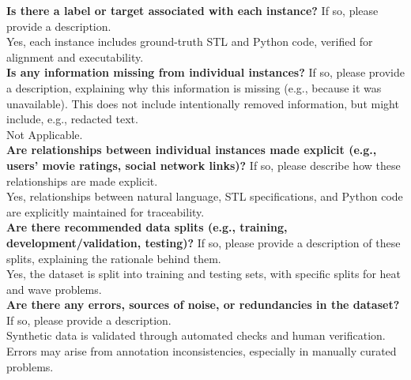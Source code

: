     \textcolor{\sectioncolor}{\textbf{Is there a label or target associated with each instance?
    }
    If so, please provide a description.
    } \\
    Yes, each instance includes ground-truth STL and Python code, verified for alignment and executability. \\
    
    \textcolor{\sectioncolor}{\textbf{Is any information missing from individual instances?
    }
    If so, please provide a description, explaining why this information is
    missing (e.g., because it was unavailable). This does not include
    intentionally removed information, but might include, e.g., redacted text.
    } \\
    Not Applicable. \\
    
    \textcolor{\sectioncolor}{\textbf{Are relationships between individual instances made explicit (e.g., users’
    movie ratings, social network links)?
    }
    If so, please describe how these relationships are made explicit.
    } \\
    Yes, relationships between natural language, STL specifications, and Python code are explicitly maintained for traceability. \\
    
    \textcolor{\sectioncolor}{\textbf{Are there recommended data splits (e.g., training, development/validation,
    testing)?
    }
    If so, please provide a description of these splits, explaining the
    rationale behind them.
    } \\
    Yes, the dataset is split into training and testing sets, with specific splits for heat and wave problems. \\
    
    \textcolor{\sectioncolor}{\textbf{Are there any errors, sources of noise, or redundancies in the dataset?
    }
    If so, please provide a description.
    } \\
    Synthetic data is validated through automated checks and human verification. Errors may arise from annotation inconsistencies, especially in manually curated problems. \\
    
